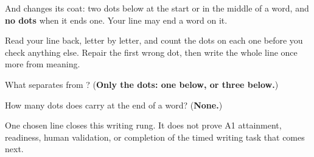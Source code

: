 And \textbf{} changes its coat: two dots below at the start or in the middle of a word, and \textbf{no dots} when it ends one. Your line may end a word on it.

Read your line back, letter by letter, and count the dots on each one before you check anything else. Repair the first wrong dot, then write the whole line once more from meaning.

\begin{tcolorbox}[breakable,colback=teal!4,colframe=teal!35!black,title={Before you move on}]
What separates \textbf{} from \textbf{}? (\textbf{Only the dots: one below, or three below.})

How many dots does \textbf{} carry at the end of a word? (\textbf{None.})

One chosen line closes this writing rung. It does not prove A1 attainment, readiness, human validation, or completion of the timed writing task that comes next.
\end{tcolorbox}
